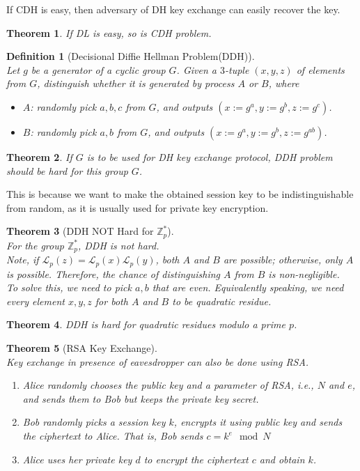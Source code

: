 \documentclass[12pt]{article}
\newtheorem{definition}{Definition}[section]
\newtheorem{theorem}{Theorem}[section]
\theoremstyle{definition}
\begin{document}
If CDH is easy, then adversary of DH key exchange can easily recover the key.
\begin{theorem}\normalfont If DL is easy, so is CDH problem.
\end{theorem}
\begin{definition}[Decisional Diffie Hellman Problem(DDH)]
\hfill\\\normalfont Let $g$ be a generator of a cyclic group $G$. Given a $3$-tuple $(x,y,z)$ of elements from $G$, distinguish whether it is generated by process $A$ or $B$, where
\begin{itemize}
  \item $A$: randomly pick $a,b,c$ from $G$, and outputs $(x:=g^a, y:=g^b, z:=g^c)$.
  \item $B$: randomly pick $a,b$ from $G$, and outputs $(x:=g^a, y:=g^b, z:=g^{ab})$.
\end{itemize}
\end{definition}
\begin{theorem}\normalfont If $G$ is to be used for DH key exchange protocol, DDH problem should be hard for this group $G$.
\end{theorem}
This is because we want to make the obtained session key to be indistinguishable from random, as it is usually used for private key encryption.
\begin{theorem}[DDH NOT Hard for {$\mathbb{Z}_p^\ast$}]
\hfill\\\normalfont For the group $\mathbb{Z}_p^\ast$, DDH is not hard.\\
Note, if $\mathcal{L}_p(z)=\mathcal{L}_p(x)\mathcal{L}_p(y)$, both $A$ and $B$ are possible; otherwise, only $A$ is possible. Therefore, the chance of distinguishing $A$ from $B$ is non-negligible.\\
To solve this, we need to pick $a, b$ that are even. Equivalently speaking, we need every element $x,y,z$ for both $A$ and $B$ to be quadratic residue.
\end{theorem}
\begin{theorem}\normalfont DDH is hard for quadratic residues modulo a prime $p$.\end{theorem}
\begin{theorem}[RSA Key Exchange]
\hfill\\\normalfont Key exchange in presence of eavesdropper can also be done using RSA. 
\begin{enumerate}
  \item Alice randomly chooses the public key and a parameter of RSA, i.e., $N$ and $e$, and sends them to Bob but keeps the private key secret.
  \item Bob randomly picks a session key $k$, encrypts it using public key and sends the ciphertext to Alice. That is, Bob sends
  $
c=k^e\mod N
  $
  \item Alice uses her private key $d$ to encrypt the ciphertext $c$ and obtain $k$.
\end{enumerate}
\end{theorem}
\end{document}
